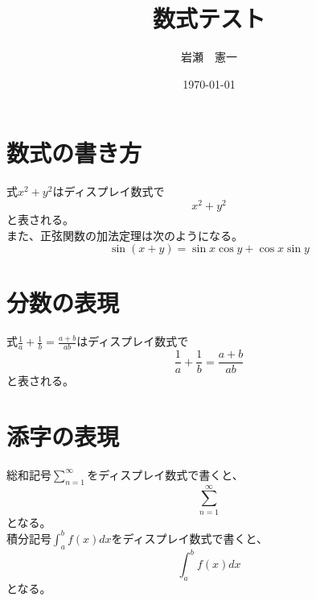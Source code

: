 \documentclass[platex,dvipdfmx]{jlreq}			%
\title{数式テスト}
\author{岩瀬　憲一}
\date{\today}
\begin{document}
\maketitle
\section{数式の書き方}
式$x^2 + y^2$はディスプレイ数式で
\[
x^2 + y^2
\]
と表される。\\
また、正弦関数の加法定理は次のようになる。
\begin{equation}
  \sin(x+y) = \sin x \cos y + \cos x \sin y
\end{equation}
\section{分数の表現}
式$\frac{1}{a} + \frac{1}{b} = \frac{a+b}{ab}$はディスプレイ数式で
\[
\frac{1}{a} + \frac{1}{b} = \frac{a+b}{ab}
\]
と表される。
\section{添字の表現}
総和記号$\sum_{n=1}^\infty$をディスプレイ数式で書くと、
\[
\sum_{n=1}^\infty
\]
となる。\\
積分記号$ \int_a^b f(x)dx $をディスプレイ数式で書くと、
\[
\int_a^b f(x)dx
\]
となる。
\end{document}
